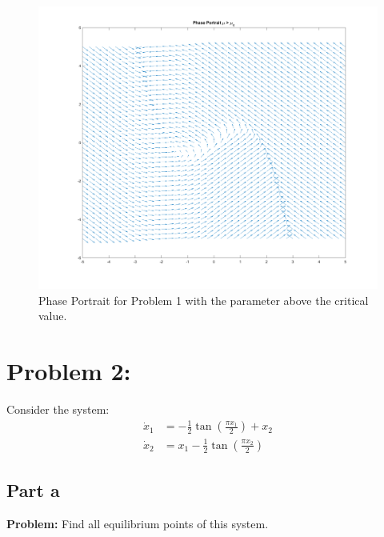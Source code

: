 \documentclass[letter]{article}
\numberwithin{equation}{section}
\begin{document}
\begin{figure}[p]
	\centering
	\includegraphics[width=\linewidth]{fig/pblm1_phaseplot_mu2}
	\caption{Phase Portrait for Problem 1 with the parameter above the critical value.}
	\label{fig:pblm1phaseplot_mu2}
\end{figure}

\newpage
\section{Problem 2:}
Consider the system:
\begin{equation}
	\begin{aligned}
		\dot{x}_1 &= -\frac{1}{2} \tan(\frac{\pi x_1}{2}) + x_2\\
		\dot{x}_2 &= x_1 -\frac{1}{2} \tan(\frac{\pi x_2}{2})
	\end{aligned}
\end{equation}


\subsection{Part a}
\textbf{Problem:}
Find all equilibrium points of this system.\\
\end{document}
